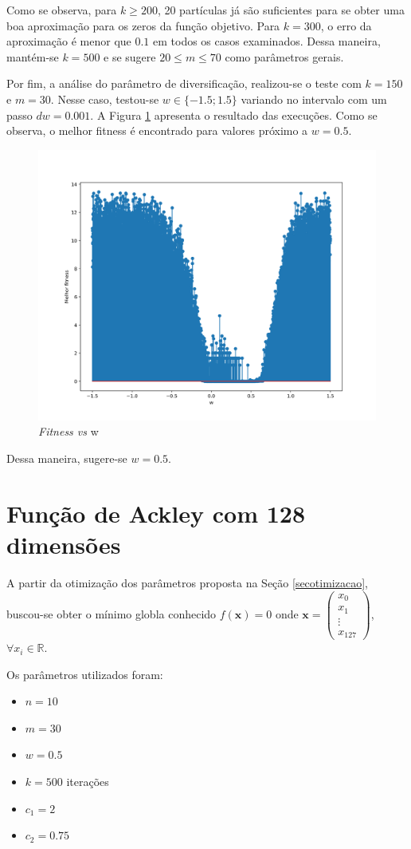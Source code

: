 \documentclass[12pt]{article}
\begin{document}
	Como se observa, para $k \geq 200$, 20 partículas já são suficientes para se obter uma boa aproximação para os zeros da função objetivo. Para $k=300$, o erro da aproximação é menor que $0.1$ em todos os casos examinados. Dessa maneira, mantém-se $k=500$ e se sugere $  20 \leq m \leq 70 $ como parâmetros gerais. 
	
	Por fim, a análise do parâmetro de diversificação, realizou-se o teste com $k=150$ e $m=30$. Nesse caso, testou-se $w \in  \{ -1.5; 1.5\}$ variando no intervalo com um passo $dw = 0.001$. 
	A Figura \ref{fig_possivelresultadow} apresenta o resultado das execuções. Como se observa, o melhor fitness é encontrado para valores próximo a $w=0.5$.
	
	\begin{figure}[h!]
		\centering
		\includegraphics[width=0.7\linewidth]{../possivel_resultado_w}
		\caption{\textit{Fitness vs} w}
		\label{fig_possivelresultadow}
	\end{figure}
	Dessa maneira, sugere-se $w = 0.5$. 
	
	
	\section{Função de Ackley com 128 dimensões}
	A partir da otimização dos parâmetros proposta na Seção \ref{secotimizacao}, buscou-se obter o mínimo globla conhecido $f(\mathbf{x}) = 0$ onde $\mathbf{x}= \begin{pmatrix}
		x_0 \\
		x_1 \\
		\vdots \\
		x_{127}
	\end{pmatrix}$, $\forall x_i \in \mathbb{R}$.
	
	Os parâmetros utilizados foram: 
	\begin{itemize}[itemsep=0pt, topsep=0pt, parsep=0pt, partopsep=0pt]
		\item $n = 10$
		\item $m = 30$
		\item $w = 0.5$
		\item $k = 500$ iterações
		\item $c_1 = 2$
		\item $c_2 = 0.75$
	\end{itemize}
	
\end{document}
